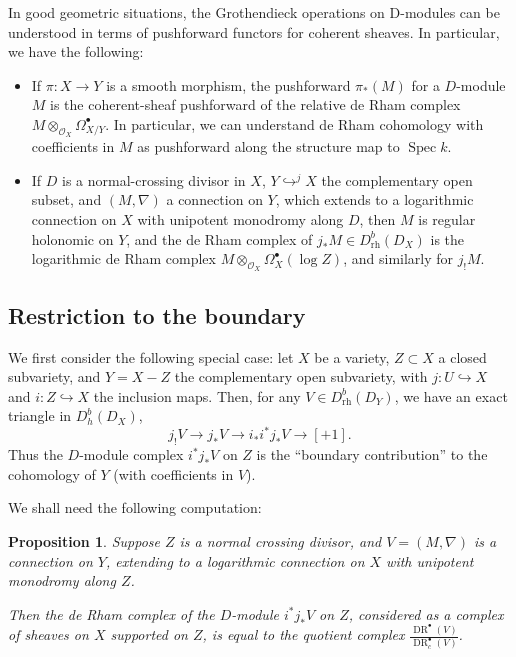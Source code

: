 \documentclass[cjm]{ipart}
\theoremstyle{plain}
\newtheorem{proposition}[theorem]{Proposition}
\theoremstyle{remark}
\DeclareMathOperator{\DR}{DR}
\DeclareMathOperator{\Spec}{Spec}
\newcommand{\cO}{\mathcal{O}}
\newcommand{\into}{\hookrightarrow}
\numberwithin{equation}{subsection}
\begin{document}
  \begin{note}
   In good geometric situations, the Grothendieck operations on D-modules can be understood in terms of pushforward functors for coherent sheaves. In particular, we have the following:
   \begin{itemize}
    \item If $\pi: X \to Y$ is a smooth morphism, the pushforward $\pi_*(M)$ for a $D$-module $M$ is the coherent-sheaf pushforward of the relative de Rham complex $M \otimes_{\cO_X} \Omega^\bullet_{X / Y}$. In particular, we can understand de Rham cohomology with coefficients in $M$ as pushforward along the structure map to $\Spec k$.
    \item If $D$ is a normal-crossing divisor in $X$, $Y \into^j X$ the complementary open subset, and $(M, \nabla)$ a connection on $Y$, which extends to a logarithmic connection on $X$ with unipotent monodromy along $D$, then $M$ is regular holonomic on $Y$, and the de Rham complex of $j_* M \in D^b_{\mathrm{rh}}(D_X)$ is the logarithmic de Rham complex $M \otimes_{\cO_X} \Omega^\bullet_{X}(\log Z)$, and similarly for $j_! M$.\qedhere
   \end{itemize}
  \end{note}

 \subsection{Restriction to the boundary}

  We first consider the following special case: let $X$ be a variety, $Z \subset X$ a closed subvariety, and $Y = X - Z$ the complementary open subvariety, with $j : U \into X$ and $i : Z \into X$ the inclusion maps. Then, for any $V \in D^b_{\mathrm{rh}}(D_Y)$, we have an exact triangle in $D^b_h(D_X)$,
  \begin{equation}
   \label{eq:exacttri}
   j_! V \to j_* V \to i_* i^* j_* V \to [+1].
  \end{equation}
  Thus the $D$-module complex $i^* j_* V$ on $Z$ is the ``boundary contribution'' to the cohomology of $Y$ (with coefficients in $V$).

  We shall need the following computation:

  \begin{proposition}
   Suppose $Z$ is a normal crossing divisor, and $V = (M, \nabla)$ is a connection on $Y$, extending to a logarithmic connection on $X$ with unipotent monodromy along $Z$.

   Then the de Rham complex of the $D$-module $i^* j_* V$ on $Z$, considered as a complex of sheaves on $X$ supported on $Z$, is equal to the quotient complex $\frac{\DR^\bullet(V)}{\DR^\bullet_c(V)}$.
  \end{proposition}
\end{document}
